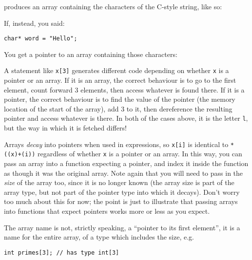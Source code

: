 \documentclass[a4paper]{scrartcl}
\begin{document}
produces an array containing the characters of the C-style string, like so:


If, instead, you said:
\begin{verbatim}
char* word = "Hello";
\end{verbatim}
You get a pointer to an array containing those characters:


A statement like \verb|x[3]| generates different code depending on whether \verb|x| is a pointer or an array. If it is an array, the correct behaviour is to go to the first element, count forward $3$ elements, then access whatever is found there. If it is a pointer, the correct behaviour is to find the value of the pointer (the memory location of the start of the array), add $3$ to it, then dereference the resulting pointer and access whatever is there. In both of the cases above, it is the letter \verb|l|, but the way in which it is fetched differs!

Arrays \emph{decay} into pointers when used in expressions, so \verb|x[i]| is identical to \verb|*((x)+(i))| regardless of whether \verb|x| is a pointer or an array. In this way, you can pass an array into a function expecting a pointer, and index it inside the function as though it was the original array. Note again that you will need to pass in the \emph{size} of the array too, since it is no longer known (the array size is part of the array type, but not part of the pointer type into which it decays). Don't worry too much about this for now; the point is just to illustrate that passing arrays into functions that expect pointers works more or less as you expect.

The array name is not, strictly speaking, a ``pointer to its first element'', it is a name for the entire array, of a type which includes the size, e.g.
\begin{verbatim}
int primes[3]; // has type int[3]
\end{verbatim}
\end{document}
